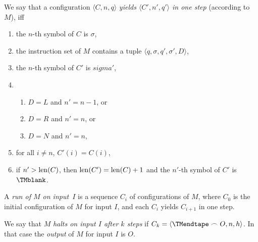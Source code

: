 \documentclass[../../include/open-logic-section]{subfiles}
\begin{document}
\begin{defn}
We say that a configuration $\langle C, n, q\rangle$ \emph{yields
  $\langle C', n', q'\rangle$ in one step} (according to $M$), iff
\begin{enumerate}
\item the $n$-th symbol of $C$ is $\sigma$,
\item the instruction set of $M$ contains a tuple $\langle q, \sigma,
  q', \sigma', D\rangle$, 
\item the $n$-th symbol of $C'$ is $sigma'$,
\item 
\begin{enumerate}
\item $D = L$ and $n' = n -1$, or
\item $D = R$ and $n' = n$, or
\item $D = N$ and $n' = n$, 
\end{enumerate}
\item for all $i \neq n$, $C'(i) = C(i)$,
\item if $n' > \mathrm{len}(C)$, then $\mathrm{len}(C') = \mathrm{len}(C) + 1$ and the $n'$-th
  symbol of $C'$ is $\TMblank$.
\end{enumerate}
\end{defn}

\begin{defn}
A \emph{run of $M$ on input~$I$} is a sequence $C_i$ of configurations
of $M$, where $C_0$ is the initial configuration of $M$ for input $I$,
and each $C_i$ yields $C_{i+1}$ in one step.  

We say that $M$ \emph{halts on input $I$ after $k$ steps} if $C_k =
\langle \TMendtape \frown O, n, h\rangle$. In that case the
\emph{output} of $M$ for input $I$ is $O$.
\end{defn}
\end{document}
